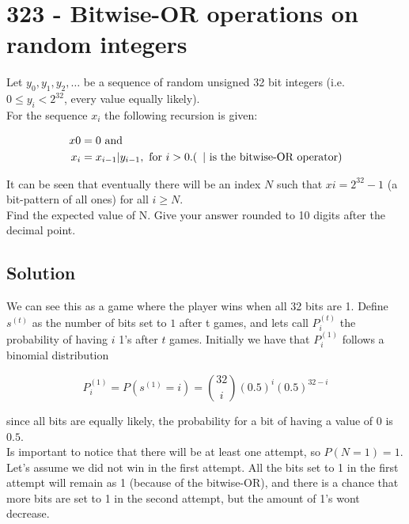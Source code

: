 \chapter*{323 - Bitwise-OR operations on random integers}

Let $y_0, y_1, y_2, \ldots$ be a sequence of random unsigned 32 bit integers
(i.e. $0 \leq y_i < 2^{32}$, every value equally likely).\\

For the sequence $x_i$ the following recursion is given:

\begin{align*}
    x0 &= 0 \mbox{ and} \\
    x_i &= x_{i-1}|y_{i-1}, \mbox{ for } i > 0. ( \hphantom{2} | \mbox{ is the bitwise-OR operator})
\end{align*}

It can be seen that eventually there will be an index $N$ such that $xi = 2^{32} -1$ (a bit-pattern of all ones) for all $i \geq N$.\\

Find the expected value of N. 
Give your answer rounded to 10 digits after the decimal point.

\section*{Solution}

We can see this as a game where the player wins when all 32 bits are 1. Define $s^{(t)}$ as the number of bits set to $1$ after t games, and lets call $P_i^{(t)}$ the probability of having $i$ 1's after $t$ games. Initially we have that $P_i^{(1)}$ follows a binomial distribution

$$
P_i^{(1)} = P(s^{(1)}=i) = \binom{32}{i} (0.5)^i (0.5)^{32-i}
$$

since all bits are equally likely, the probability for a bit of having a value of 0 is $0.5$.\\

Is important to notice that there will be at least one attempt, so $P(N=1) = 1$.\\

Let's assume we did not win in the first attempt. All the bits set to 1 in the first attempt will remain as 1 (because of the bitwise-OR), and there is a chance  that more bits are set to 1 in the second attempt, but the amount of 1's wont decrease.\\

